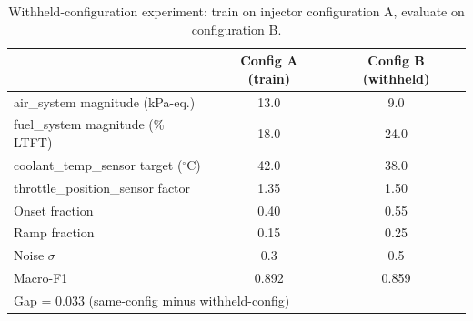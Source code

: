 \begin{table}[H]
  \centering
  \caption{Withheld-configuration experiment: train on injector
    configuration A, evaluate on configuration B.}
  \label{tab:withheld}
  \begin{tabular}{lcc}
    \toprule
    & Config A (train) & Config B (withheld)\\
    \midrule
    air\_system magnitude (kPa-eq.)       & 13.0 & 9.0\\
    fuel\_system magnitude (\% LTFT)      & 18.0 & 24.0\\
    coolant\_temp\_sensor target ($^{\circ}$C) & 42.0 & 38.0\\
    throttle\_position\_sensor factor     & 1.35 & 1.50\\
    Onset fraction                        & 0.40 & 0.55\\
    Ramp fraction                         & 0.15 & 0.25\\
    Noise $\sigma$                        & 0.3  & 0.5\\
    \midrule
    Macro-F1                              & 0.892 & 0.859\\
    \multicolumn{3}{l}{Gap = 0.033 (same-config minus withheld-config)}\\
    \bottomrule
  \end{tabular}
\end{table}
